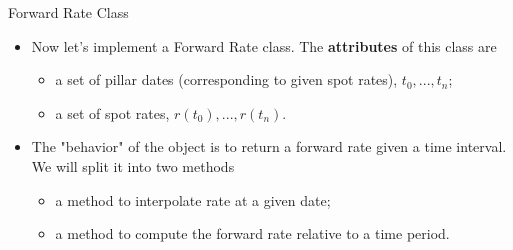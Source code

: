 \documentclass{beamer}
\begin{document}
\begin{frame}{Forward Rate Class}
  \begin{itemize}
  \item Now let's implement a Forward Rate class. The \textbf{attributes} of this class are
      \begin{itemize}
      \item a set of pillar dates (corresponding to given spot rates), $t_0,...,t_{n}$;
      \item a set of spot rates, $r(t_0),...,r(t_{n})$.
      \end{itemize}
  \item The "behavior" of the object is to return a forward rate given a time interval. We will split it into two methods
    \begin{itemize}
    \item a method to interpolate rate at a given date; 
    \item a method to compute the forward rate relative to a time period.
    \end{itemize}
  \end{itemize}
\href{https://colab.research.google.com/drive/1E-zwmNZ6MSF-I8R2cWvKfPGdmm5SYOMU?authuser=1\#scrollTo=kuN09S2AxZL1}{}
\end{frame}
\end{document}
